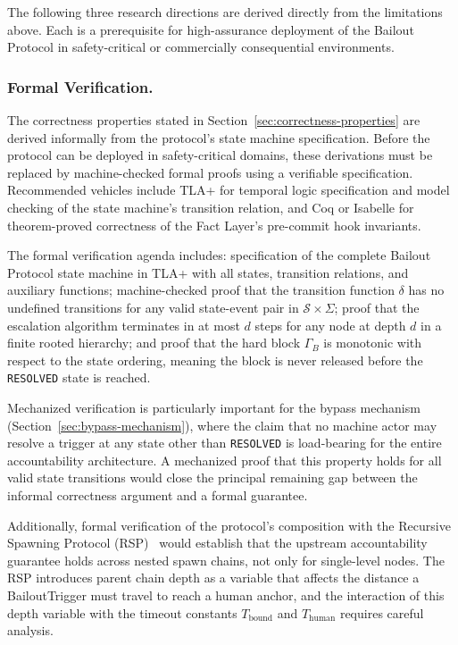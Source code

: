 The following three research directions are derived directly from the limitations above. Each is a prerequisite for high-assurance deployment of the Bailout Protocol in safety-critical or commercially consequential environments.

\subsubsection{Formal Verification.}
\label{sec:fw-verification}

The correctness properties stated in Section~\ref{sec:correctness-properties} are derived informally from the protocol's state machine specification. Before the protocol can be deployed in safety-critical domains, these derivations must be replaced by machine-checked formal proofs using a verifiable specification. Recommended vehicles include TLA+ for temporal logic specification and model checking of the state machine's transition relation, and Coq or Isabelle for theorem-proved correctness of the Fact Layer's pre-commit hook invariants.

The formal verification agenda includes: specification of the complete Bailout Protocol state machine in TLA+ with all states, transition relations, and auxiliary functions; machine-checked proof that the transition function $\delta$ has no undefined transitions for any valid state-event pair in $\mathcal{S} \times \Sigma$; proof that the escalation algorithm terminates in at most $d$ steps for any node at depth $d$ in a finite rooted hierarchy; and proof that the hard block $\Gamma_B$ is monotonic with respect to the state ordering, meaning the block is never released before the \texttt{RESOLVED} state is reached.

Mechanized verification is particularly important for the bypass mechanism (Section~\ref{sec:bypass-mechanism}), where the claim that no machine actor may resolve a trigger at any state other than \texttt{RESOLVED} is load-bearing for the entire accountability architecture. A mechanized proof that this property holds for all valid state transitions would close the principal remaining gap between the informal correctness argument and a formal guarantee.

Additionally, formal verification of the protocol's composition with the Recursive Spawning Protocol (RSP)~\cite{bx3-framework} would establish that the upstream accountability guarantee holds across nested spawn chains, not only for single-level nodes. The RSP introduces parent chain depth as a variable that affects the distance a BailoutTrigger must travel to reach a human anchor, and the interaction of this depth variable with the timeout constants $T_{\text{bound}}$ and $T_{\text{human}}$ requires careful analysis.

